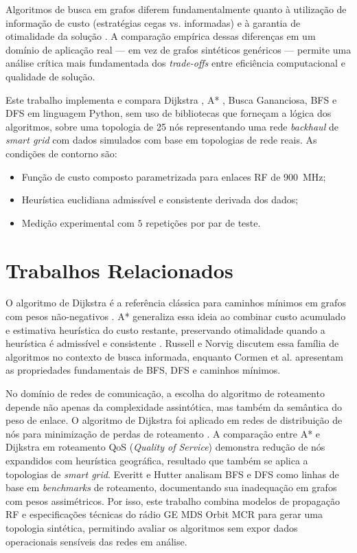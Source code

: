 \documentclass[conference]{IEEEtran}
\begin{document}
Algoritmos de busca em grafos diferem fundamentalmente quanto à utilização
de informação de custo (estratégias cegas vs. informadas) e à garantia de
otimalidade da solução \cite{russell2020}. A comparação empírica dessas
diferenças em um domínio de aplicação real — em vez de grafos sintéticos
genéricos — permite uma análise crítica mais fundamentada dos \textit{trade-offs}
entre eficiência computacional e qualidade de solução.

Este trabalho implementa e compara Dijkstra \cite{dijkstra1959}, A*
\cite{hart1968}, Busca Gananciosa, BFS e DFS em linguagem Python, sem uso de
bibliotecas que forneçam a lógica dos algoritmos, sobre uma topologia de
25 nós representando uma rede \textit{backhaul} de \textit{smart grid} com dados
simulados com base em topologias de rede reais. As condições de contorno são:

\begin{itemize}
  \item Função de custo composto parametrizada para enlaces RF de 900~MHz;
  \item Heurística euclidiana admissível e consistente derivada dos dados;
  \item Medição experimental com $5$ repetições por par de teste.
\end{itemize}

\section{Trabalhos Relacionados}

O algoritmo de Dijkstra é a referência clássica para caminhos mínimos em
grafos com pesos não-negativos \cite{dijkstra1959}. A* generaliza essa
ideia ao combinar custo acumulado e estimativa heurística do custo restante,
preservando otimalidade quando a heurística é admissível e consistente
\cite{hart1968}. Russell e Norvig \cite{russell2020} discutem essa família
de algoritmos no contexto de busca informada, enquanto Cormen et al.
\cite{cormen2022} apresentam as propriedades fundamentais de BFS, DFS e
caminhos mínimos.

No domínio de redes de comunicação, a escolha do algoritmo de roteamento
depende não apenas da complexidade assintótica, mas também da semântica do
peso de enlace. O algoritmo de Dijkstra foi aplicado em redes de distribuição
de nós para minimização de perdas de roteamento \cite{jha2013dijkstra}.
A comparação entre A* e Dijkstra em roteamento QoS (\textit{Quality of Service})
\cite{ayari2025astar} demonstra redução de nós expandidos com heurística
geográfica, resultado que também se aplica a topologias de \textit{smart grid}.
Everitt e Hutter \cite{everitt2015bfsdfs} analisam BFS e DFS como linhas
de base em \textit{benchmarks} de roteamento, documentando sua inadequação em 
grafos com pesos assimétricos. Por isso, este trabalho combina modelos de 
propagação RF \cite{rappaport2002,itu2019} e especificações técnicas do rádio 
GE MDS Orbit MCR \cite{ge_mds_mcr} para gerar uma topologia sintética, permitindo
avaliar os algoritmos sem expor dados operacionais sensíveis das redes em análise.
\end{document}
